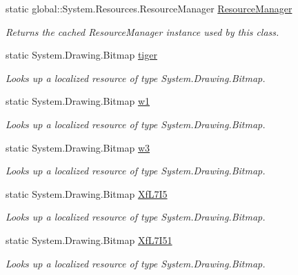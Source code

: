 \begin{DoxyCompactItemize}
static global\+::\+System.\+Resources.\+Resource\+Manager \hyperlink{classWildlifeTrackingApp_1_1Properties_1_1Resources_a0facd9f93017f922ba97bef37fd95b1d}{Resource\+Manager}
\begin{DoxyCompactList}\small\item\em Returns the cached Resource\+Manager instance used by this class. \end{DoxyCompactList}\item 
static System.\+Drawing.\+Bitmap \hyperlink{classWildlifeTrackingApp_1_1Properties_1_1Resources_a1c8ec9f550bb1f3cbe7cc93257b0b4d7}{tiger}
\begin{DoxyCompactList}\small\item\em Looks up a localized resource of type System.\+Drawing.\+Bitmap. \end{DoxyCompactList}\item 
static System.\+Drawing.\+Bitmap \hyperlink{classWildlifeTrackingApp_1_1Properties_1_1Resources_a0f99bbab5f157297954b10d71ba7d26e}{w1}
\begin{DoxyCompactList}\small\item\em Looks up a localized resource of type System.\+Drawing.\+Bitmap. \end{DoxyCompactList}\item 
static System.\+Drawing.\+Bitmap \hyperlink{classWildlifeTrackingApp_1_1Properties_1_1Resources_adae137008920fbb97e674cf1b3af8c1c}{w3}
\begin{DoxyCompactList}\small\item\em Looks up a localized resource of type System.\+Drawing.\+Bitmap. \end{DoxyCompactList}\item 
static System.\+Drawing.\+Bitmap \hyperlink{classWildlifeTrackingApp_1_1Properties_1_1Resources_ad53def0f8b6789aa31ac53fda40bbac5}{Xf\+L7\+I5}
\begin{DoxyCompactList}\small\item\em Looks up a localized resource of type System.\+Drawing.\+Bitmap. \end{DoxyCompactList}\item 
static System.\+Drawing.\+Bitmap \hyperlink{classWildlifeTrackingApp_1_1Properties_1_1Resources_af61d1311106833aa651ee30943901e17}{Xf\+L7\+I51}
\begin{DoxyCompactList}\small\item\em Looks up a localized resource of type System.\+Drawing.\+Bitmap. \end{DoxyCompactList}\end{DoxyCompactItemize}

